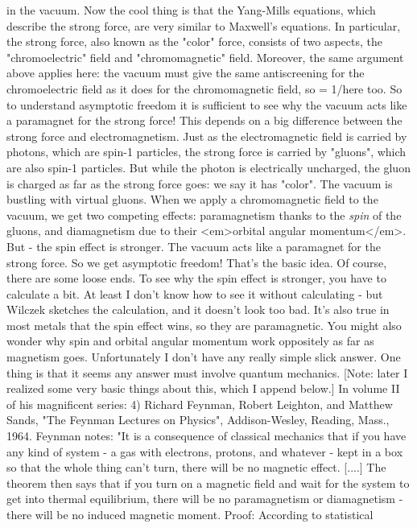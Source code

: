 in the vacuum.  
Now the cool thing is that the Yang-Mills equations, which describe
the strong force, are very similar to Maxwell's equations.  In 
particular, the strong force, also known as the "color" force, 
consists of two aspects, the "chromoelectric" field and "chromomagnetic"
field.  Moreover, the same argument above applies here: the vacuum
must give the same antiscreening for the chromoelectric field as
it does for the chromomagnetic field, so \epsilon  = 1/\mu  here too.
So to understand asymptotic freedom it is sufficient to see why the
vacuum acts like a paramagnet for the strong force!   This depends
on a big difference between the strong force and electromagnetism.
Just as the electromagnetic field is carried by photons, which are
spin-1 particles, the strong force is carried by "gluons", which
are also spin-1 particles.  But while the photon is electrically 
uncharged, the gluon is charged as far as the strong force goes: we 
say it has "color".  
The vacuum is bustling with virtual gluons.  When we apply a chromomagnetic
field to the vacuum, we get two competing effects: paramagnetism thanks
to the \emph{spin} of the gluons, and diamagnetism due to their <em>orbital
angular momentum</em>.  But - the spin effect is stronger.  The vacuum
acts like a paramagnet for the strong force.  So we get asymptotic
freedom!
That's the basic idea.  Of course, there are some loose ends.
To see why the spin effect is stronger, you have to calculate a bit.  
At least I don't know how to see it without calculating - but Wilczek 
sketches the calculation, and it doesn't look too bad.   It's also true 
in most metals that the spin effect wins, so they are paramagnetic. 
You might also wonder why spin and orbital angular momentum work
oppositely as far as magnetism goes.  Unfortunately I don't have any
really simple slick answer.   One thing is that it seems any answer
must involve quantum mechanics.  [Note: later I realized
some very basic things about this, which I append below.]
In volume II of his magnificent 
series:
4) Richard Feynman, Robert Leighton, and Matthew Sands, "The
Feynman Lectures on Physics", Addison-Wesley, Reading, Mass., 1964. 
Feynman notes: "It is a consequence of classical mechanics that
if you have any kind of system - a gas with electrons, protons, and
whatever - kept in a box so that the whole thing can't turn, there
will be no magnetic effect.  [....]  The theorem then says that if
you turn on a magnetic field and wait for the system to get into
thermal equilibrium, there will be no paramagnetism or diamagnetism -
there will be no induced magnetic moment.  Proof: According to statistical
